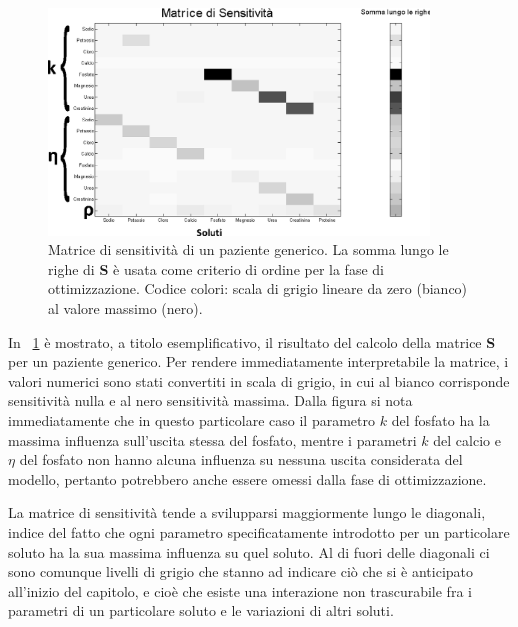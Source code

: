 \begin{figure}[!b]
	\centering
		\includegraphics[width=0.9\textwidth]{immagini/sens.eps}
				\caption{Matrice di sensitività di un paziente generico. La somma lungo le righe di \textbf{S} è usata come criterio di ordine per la fase di ottimizzazione. Codice colori: scala di grigio lineare da zero (bianco) al valore massimo (nero).}\label{fig:sens}
\end{figure}

In \figurename~\ref{fig:sens} è mostrato, a titolo esemplificativo, il risultato del calcolo della matrice \textbf{S} per un paziente generico. Per rendere immediatamente interpretabile la matrice, i valori numerici sono stati convertiti in scala di grigio, in cui al bianco corrisponde sensitività nulla e al nero sensitività massima. Dalla figura si nota immediatamente che in questo particolare caso il parametro $k$ del fosfato ha la massima influenza sull'uscita stessa del fosfato, mentre i parametri $k$ del calcio e $\eta$ del fosfato non hanno alcuna influenza su nessuna uscita considerata del modello, pertanto potrebbero anche essere omessi dalla fase di ottimizzazione.

La matrice di sensitività tende a svilupparsi maggiormente lungo le diagonali, indice del fatto che ogni parametro specificatamente introdotto per un particolare soluto ha la sua massima influenza su quel soluto. Al di fuori delle diagonali ci sono comunque livelli di grigio che stanno ad indicare ciò che si è anticipato all'inizio del capitolo, e cioè che esiste una interazione non trascurabile fra i parametri di un particolare soluto e le variazioni di altri soluti.


